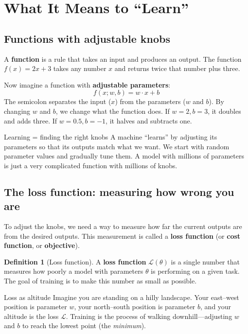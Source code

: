 \documentclass[11pt,a4paper]{article}
\theoremstyle{definition}
\newtheorem{definition}{Definition}[section]
\begin{document}
\section{What It Means to ``Learn''}
\label{sec:learning}

\subsection{Functions with adjustable knobs}

A \textbf{function} is a rule that takes an input and produces an
output. The function $f(x) = 2x + 3$ takes any number $x$ and
returns twice that number plus three.

Now imagine a function with \textbf{adjustable parameters}:
\[
f(x; w, b) = w \cdot x + b
\]
The semicolon separates the input ($x$) from the parameters ($w$ and
$b$). By changing $w$ and $b$, we change what the function does. If
$w=2, b=3$, it doubles and adds three. If $w=0.5, b=-1$, it halves
and subtracts one.

\begin{keyidea}{Learning = finding the right knobs}
A machine ``learns'' by adjusting its parameters so that its outputs
match what we want. We start with random parameter values and
gradually tune them. A model with millions of parameters is just a
very complicated function with millions of knobs.
\end{keyidea}

\subsection{The loss function: measuring how wrong you are}

To adjust the knobs, we need a way to measure how far the current
outputs are from the desired outputs. This measurement is called a
\textbf{loss function} (or \textbf{cost function}, or
\textbf{objective}).

\begin{definition}[Loss function]
A \textbf{loss function} $\mathcal{L}(\theta)$ is a single number
that measures how poorly a model with parameters $\theta$ is
performing on a given task. The goal of training is to make this
number as small as possible.
\end{definition}

\begin{intuition}{Loss as altitude}
Imagine you are standing on a hilly landscape. Your east--west
position is parameter $w$, your north--south position is parameter
$b$, and your altitude is the loss $\mathcal{L}$. Training is the
process of walking downhill---adjusting $w$ and $b$ to reach the
lowest point (the \emph{minimum}).
\end{intuition}
\end{document}
